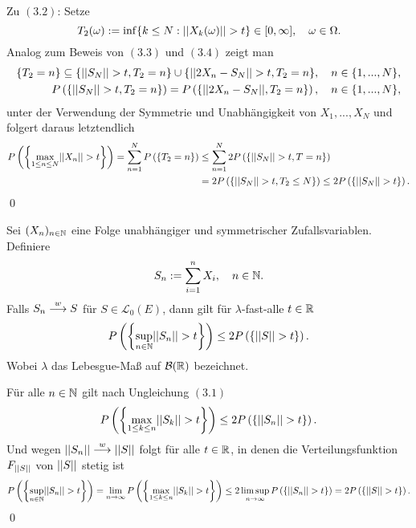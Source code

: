 \begin{proof*}
    Zu $(3.2)$: 
    Setze 
    $$
        T_2(\omega) := \inf\{k \leq N: \lvert\lvert X_k(\omega) \rvert\rvert > t\} \in [0, \infty], \quad \omega \in \Omega. 
    $$
    Analog zum Beweis von $(3.3)$ und $(3.4)$ zeigt man 
    \begin{align*}
        \{T_2 = n\} \subseteq \{\lvert\lvert S_N \rvert\rvert > t, T_2 =n\} \cup \{\lvert\lvert 2X_n - S_N \rvert\rvert > t, T_2=n\}, \quad n \in \{1,...,N\}, \\\
        P\left(\left\{ \lvert\lvert S_N \rvert\rvert > t, T_2 = n \right\}\right) = P\left(\left\{ \lvert\lvert 2X_n - S_N \rvert\rvert, T_2 = n \right\}\right), \quad n \in \{1,...,N\},
    \end{align*}
    unter der Verwendung der Symmetrie und Unabhängigkeit von $X_1,...,X_N$ und folgert daraus letztendlich 
    \begin{align*}
        P\left(\left\{ \max_{1\leq n \leq N} \lvert\lvert X_n \rvert\rvert > t \right\}\right) = \sum_{n=1}^N P\left(\left\{ T_2 = n \right\}\right) 
                                                    &\leq \sum_{n=1}^N 2P\left(\left\{ \lvert\lvert S_N \rvert\rvert > t, T=n \right\}\right) \\\
                                                    &= 2 P\left(\left\{ \lvert\lvert S_N \rvert\rvert>t, T_2 \leq N \right\}\right) \leq 2 P\left(\left\{ \lvert\lvert S_N \rvert\rvert > t \right\}\right). 
    \end{align*}
    \qed 
\end{proof*}

\begin{corollary}
    Sei $(X_n)_{n \in \mathbb{N}}$ eine Folge unabhängiger und symmetrischer Zufallsvariablen. Definiere
    $$
        S_n := \sum_{i=1}^n X_i, \quad n \in \mathbb{N}. 
    $$
    Falls $S_n \overset{w}{\longrightarrow} S$ für $S \in \mathcal{L}_0(E)$, dann gilt für $\lambda$-fast-alle $t \in \mathbb{R}$
    $$
        P\left(\left\{ \sup_{n \in \mathbb{N}}\lvert\lvert S_n \rvert\rvert > t \right\}\right) \leq 2 P\left(\left\{ \lvert\lvert S \rvert\rvert > t \right\}\right).
    $$
    Wobei $\lambda$ das Lebesgue-Maß auf $\mathcal{B}(\mathbb{R})$ bezeichnet. 
\end{corollary}

\begin{proof*}
    Für alle $n \in \mathbb{N}$ gilt nach Ungleichung $(3.1)$
    $$
        P\left(\left\{ \max_{1\leq k \leq n}\lvert\lvert S_k \rvert\rvert > t \right\}\right) \leq 2 P\left(\left\{ \lvert\lvert S_n \rvert\rvert > t \right\}\right).
    $$
    Und wegen $\lvert\lvert S_n \rvert\rvert \overset{w}{\longrightarrow} \lvert\lvert S \rvert\rvert$ folgt für alle $t \in \mathbb{R}$, in denen die Verteilungsfunktion $F_{\lvert\lvert S \rvert\rvert}$ von $\lvert\lvert S \rvert\rvert$ stetig ist 
    $$
        P\left(\left\{ \sup_{n \in \mathbb{N}}\lvert\lvert S_n \rvert\rvert > t \right\}\right) = \lim_{n \to \infty}P\left(\left\{ \max_{1\leq k \leq n}\lvert\lvert S_k \rvert\rvert > t \right\}\right) \leq 2 \limsup_{n \to \infty}P\left(\left\{ \lvert\lvert S_n \rvert\rvert > t \right\}\right) = 2P\left(\left\{ \lvert\lvert S \rvert\rvert >t \right\}\right). 
    $$
    \qed
\end{proof*}

